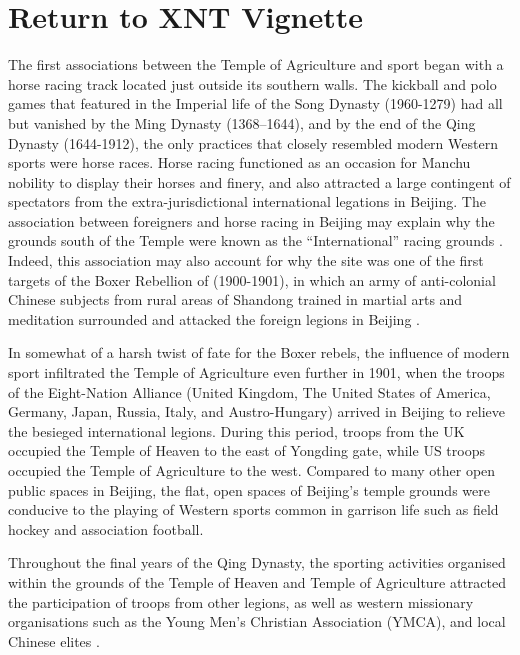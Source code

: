 

\section{Return to XNT Vignette}
The first associations between the Temple of Agriculture and sport began with a horse racing track located just outside its southern walls.  The kickball and polo games that featured in the Imperial life of the Song Dynasty (1960-1279) had all but vanished by the Ming Dynasty (1368–1644), and by the end of the Qing Dynasty (1644-1912), the only practices that closely resembled modern Western sports were horse races.  Horse racing functioned as an occasion for Manchu nobility to display their horses and finery, and also attracted a large contingent of spectators from the extra-jurisdictional international legations in Beijing.  The association between foreigners and horse racing in Beijing may explain why the grounds south of the Temple were known as the ``International'' racing grounds \citep{Brownell2008}. Indeed, this association may also account for why the site was one of the first targets of the Boxer Rebellion of (1900-1901), in which an army of anti-colonial Chinese subjects from rural areas of Shandong trained in martial arts and meditation surrounded and attacked the foreign legions in Beijing \citep{Brownell2008}.

In somewhat of a harsh twist of fate for the Boxer rebels, the influence of modern sport infiltrated the Temple of Agriculture even further in 1901, when the troops of the Eight-Nation Alliance (United Kingdom, The United States of America, Germany, Japan, Russia, Italy, and Austro-Hungary) arrived in Beijing to relieve the besieged international legions.  During this period, troops from the UK occupied the Temple of Heaven to the east of Yongding gate, while US troops occupied the Temple of Agriculture to the west. Compared to many other open public spaces in Beijing, the flat, open spaces of Beijing's temple grounds were conducive to the playing of Western sports common in garrison life such as field hockey and association football.

Throughout the final years of the Qing Dynasty, the sporting activities organised within the grounds of the Temple of Heaven and Temple of Agriculture attracted the participation of troops from other legions, as well as western missionary organisations such as the Young Men’s Christian Association (YMCA), and local Chinese elites \citep{Steel1985}.





